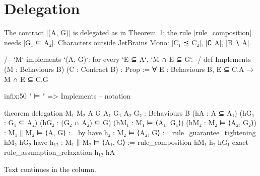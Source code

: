 
\section{Delegation}
The contract \lean|(A, G)| is delegated as in Theorem~1; the rule \lean|rule_composition| needs \lean|G₁ ⊆ A₂|.
Characters outside JetBrains Mono: \lean|C₁ ⪯ C₂|, \lean|∁ A|, \lean|B ∖ A|.
\begin{leancode}
/-- `M` implements `(A, G)`: for every `E ⊆ A`, `M ∩ E ⊆ G`. -/
def Implements (M : Behaviours B) (C : Contract B) : Prop :=
  ∀ E : Behaviours B, E ⊆ C.A → M ∩ E ⊆ C.G

infix:50 " ⊨ " => Implements   -- notation

theorem delegation
    {M₁ M₂ A G A₁ G₁ A₂ G₂ : Behaviours B}
    (hA : A ⊆ A₁) (hG₁ : G₁ ⊆ A₂)
    (hG₂ : (G₂ ∩ A₂) ⊆ G)
    (hM₁ : M₁ ⊨ ⟨A₁, G₁⟩) (hM₂ : M₂ ⊨ ⟨A₂, G₂⟩) :
    M₁ ∥ M₂ ⊨ ⟨A, G⟩ := by
  have h₂ : M₂ ⊨ ⟨A₂, G⟩ :=
    rule_guarantee_tightening hM₂ hG₂
  have h₁₂ : M₁ ∥ M₂ ⊨ ⟨A₁, G⟩ :=
    rule_composition hM₁ h₂ hG₁
  exact rule_assumption_relaxation h₁₂ hA
\end{leancode}
Text continues in the column.

